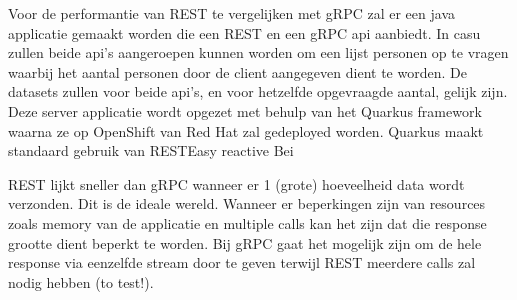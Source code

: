 Voor de performantie van REST te vergelijken met gRPC zal er een java applicatie gemaakt worden die een REST en een gRPC api aanbiedt.
In casu zullen beide api's aangeroepen kunnen worden om een lijst personen op te vragen waarbij het aantal personen door de client aangegeven dient te worden.
De datasets zullen voor beide api's, en voor hetzelfde opgevraagde aantal, gelijk zijn. Deze server applicatie wordt opgezet met behulp van het Quarkus framework
waarna ze op OpenShift van Red Hat zal gedeployed worden. Quarkus maakt standaard gebruik van RESTEasy reactive
Bei

REST lijkt sneller dan gRPC wanneer er 1 (grote) hoeveelheid data wordt verzonden.
Dit is de ideale wereld. Wanneer er beperkingen zijn van resources zoals memory van de applicatie en multiple calls kan het zijn dat die response
grootte dient beperkt te worden. Bij gRPC gaat het mogelijk zijn om de hele response via eenzelfde stream door te geven terwijl REST meerdere calls zal nodig hebben (to test!).

